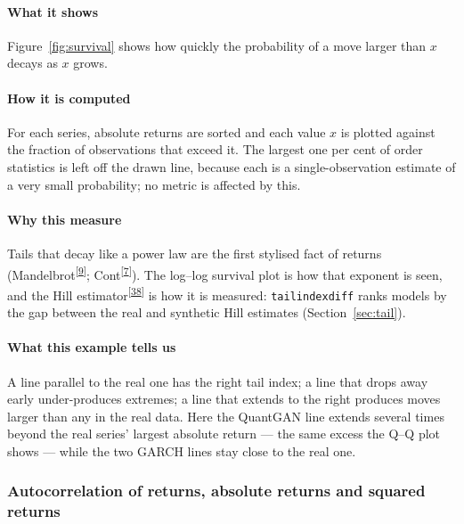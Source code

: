 \documentclass[11pt,a4paper]{article}
\makeatletter
\newcommand{\tcite}[1]{\textsuperscript{[\hyperlink{R:#1}{#1}]}}
\DeclareRobustCommand{\_}{\ifmmode\nfss@text{\textunderscore}\else\textunderscore\allowbreak\fi}
\makeatother
\begin{document}
\paragraph{What it shows} Figure~\ref{fig:survival} shows how quickly the probability of a move larger than $x$ decays as $x$ grows.

\paragraph{How it is computed} For each series, absolute returns are sorted and each value $x$ is plotted against the fraction of observations that exceed it. The largest one per cent of order statistics is left off the drawn line, because each is a single-observation estimate of a very small probability; no metric is affected by this.

\paragraph{Why this measure} Tails that decay like a power law are the first stylised fact of returns (Mandelbrot\tcite{9}; Cont\tcite{7}). The log--log survival plot is how that exponent is seen, and the Hill estimator\tcite{38} is how it is measured: \texttt{tail\_index\_diff} ranks models by the gap between the real and synthetic Hill estimates (Section~\ref{sec:tail}).

\paragraph{What this example tells us} A line parallel to the real one has the right tail index; a line that drops away early under-produces extremes; a line that extends to the right produces moves larger than any in the real data. Here the QuantGAN line extends several times beyond the real series' largest absolute return --- the same excess the Q--Q plot shows --- while the two GARCH lines stay close to the real one.

\subsubsection{Autocorrelation of returns, absolute returns and squared returns}
\label{sec:acf}
\end{document}
